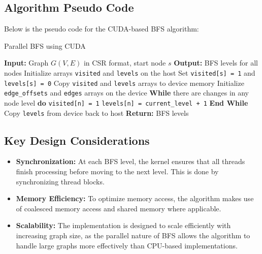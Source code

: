 \documentclass[a4paper,12pt]{article}
\begin{document}
\begin{center}
\subsection*{Algorithm Pseudo Code}

Below is the pseudo code for the CUDA-based BFS algorithm:

\begin{algorithm}[H]
\caption{Parallel BFS using CUDA}
\begin{algorithmic}[1]
\State \textbf{Input:} Graph $G(V, E)$ in CSR format, start node $s$
\State \textbf{Output:} BFS levels for all nodes
\State Initialize arrays \texttt{visited} and \texttt{levels} on the host
\State Set \texttt{visited[s] = 1} and \texttt{levels[s] = 0}
\State Copy \texttt{visited} and \texttt{levels} arrays to device memory
\State Initialize \texttt{edge\_offsets} and \texttt{edges} arrays on the device
\State \textbf{While} there are changes in any node level \textbf{do}
                    \State \texttt{visited[n] = 1}
                    \State \texttt{levels[n] = current\_level + 1}
                \EndIf
            \EndFor
        \EndIf
    \EndFor
\State \textbf{End While}
\State Copy \texttt{levels} from device back to host
\State \textbf{Return:} BFS levels
\end{algorithmic}
\end{algorithm}


\subsection*{Key Design Considerations}

\begin{itemize}
    \item \textbf{Synchronization:} At each BFS level, the kernel ensures that all threads finish processing before moving to the next level. This is done by synchronizing thread blocks.
    \item \textbf{Memory Efficiency:} To optimize memory access, the algorithm makes use of coalesced memory access and shared memory where applicable.
    \item \textbf{Scalability:} The implementation is designed to scale efficiently with increasing graph size, as the parallel nature of BFS allows the algorithm to handle large graphs more effectively than CPU-based implementations.
\end{itemize}
\newpage

\end{center}
\end{document}
